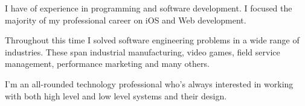 

\begin{cvparagraph}
I have  of experience in programming and software development. I focused the majority of my professional career on iOS and Web development.

Throughout this time I solved software engineering problems in a wide range of industries. These span industrial manufacturing, video games, field service management, performance marketing and many others.

I'm an all-rounded technology professional who's always interested in working with both high level and low level systems and their design.
\end{cvparagraph}
